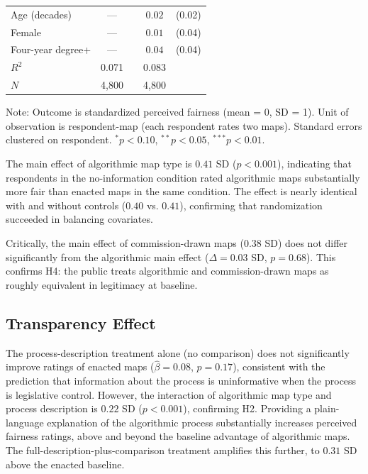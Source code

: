 \begin{table}[h!]
\begin{threeparttable}
\begin{tabular}{lcccc}
Age (decades)                    & ---          &        & $0.02$       & (0.02) \\
Female                           & ---          &        & $0.01$       & (0.04) \\
Four-year degree+                & ---          &        & $0.04$       & (0.04) \\
\midrule
$R^2$                            & 0.071        &        & 0.083        & \\
$N$                              & 4,800        &        & 4,800        & \\
\bottomrule
\end{tabular}
\begin{tablenotes}
\small \item Note: Outcome is standardized perceived fairness (mean = 0, SD = 1). Unit of observation is respondent-map (each respondent rates two maps). Standard errors clustered on respondent. $^* p < 0.10$, $^{**} p < 0.05$, $^{***} p < 0.01$.
\end{tablenotes}
\end{threeparttable}
\end{table}

The main effect of algorithmic map type is $0.41$ SD ($p < 0.001$), indicating that respondents in the no-information condition rated algorithmic maps substantially more fair than enacted maps in the same condition. The effect is nearly identical with and without controls ($0.40$ vs. $0.41$), confirming that randomization succeeded in balancing covariates.

Critically, the main effect of commission-drawn maps ($0.38$ SD) does not differ significantly from the algorithmic main effect ($\Delta = 0.03$ SD, $p = 0.68$). This confirms H4: the public treats algorithmic and commission-drawn maps as roughly equivalent in legitimacy at baseline.

\subsection{Transparency Effect}

The process-description treatment alone (no comparison) does not significantly improve ratings of enacted maps ($\hat{\beta} = 0.08$, $p = 0.17$), consistent with the prediction that information about the process is uninformative when the process is legislative control. However, the interaction of algorithmic map type and process description is $0.22$ SD ($p < 0.001$), confirming H2. Providing a plain-language explanation of the algorithmic process substantially increases perceived fairness ratings, above and beyond the baseline advantage of algorithmic maps. The full-description-plus-comparison treatment amplifies this further, to $0.31$ SD above the enacted baseline.


